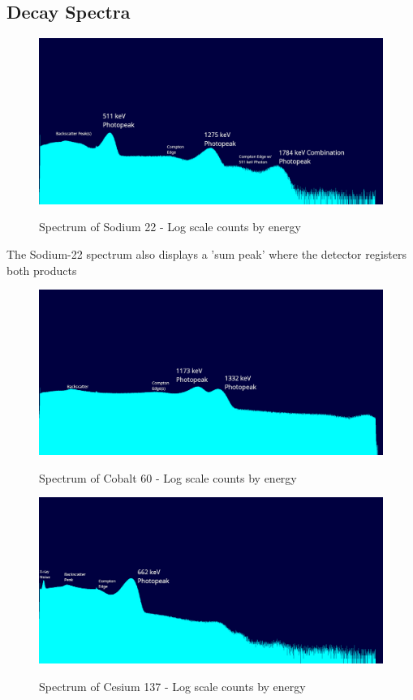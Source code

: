 \documentclass[11pt]{article} %
\begin{document}
    \subsection{Decay Spectra}
        \begin{figure}[H] \centering \label{na22}
            \includegraphics[scale=0.3]{assets/na22_log_annotated.png}
            \caption{Spectrum of Sodium 22 - Log scale counts by energy}
        \end{figure}
        The Sodium-22 spectrum also displays a 'sum peak' where the detector registers both products
        \begin{figure}[H] \centering \label{co60}
            \includegraphics[scale=0.3]{assets/co60_log_annotated.png}
            \caption{Spectrum of Cobalt 60 - Log scale counts by energy}
        \end{figure}
        \begin{figure}[H] \centering \label{cs137}
            \includegraphics[scale=0.3]{assets/cs137_log_annotated.png}
            \caption{Spectrum of Cesium 137 - Log scale counts by energy}
        \end{figure}
\end{document}
